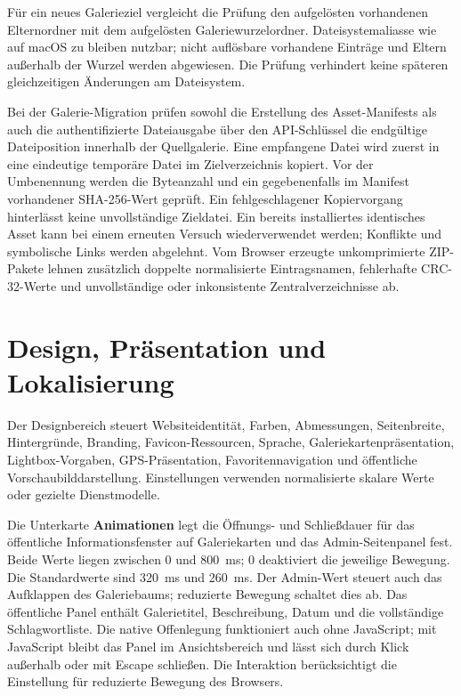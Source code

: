 \documentclass[11pt,a4paper]{article}
\newcommand{\filepath}[1]{\path{#1}}
\newcommand{\ui}[1]{\textbf{#1}}
\begin{document}
Für ein neues Galerieziel vergleicht die Prüfung den aufgelösten vorhandenen
Elternordner mit dem aufgelösten Galeriewurzelordner. Dateisystemaliasse wie
\filepath{/var} auf macOS zu \filepath{/private/var} bleiben nutzbar;
nicht auflösbare vorhandene Einträge und Eltern außerhalb der Wurzel werden
abgewiesen. Die Prüfung verhindert keine späteren gleichzeitigen Änderungen
am Dateisystem.

Bei der Galerie-Migration prüfen sowohl die Erstellung des Asset-Manifests als
auch die authentifizierte Dateiausgabe über den API-Schlüssel die endgültige
Dateiposition innerhalb der Quellgalerie. Eine empfangene Datei wird zuerst in
eine eindeutige temporäre Datei im Zielverzeichnis kopiert. Vor der Umbenennung
werden die Byteanzahl und ein gegebenenfalls im Manifest vorhandener
SHA-256-Wert geprüft. Ein fehlgeschlagener Kopiervorgang hinterlässt keine
unvollständige Zieldatei. Ein bereits installiertes identisches Asset kann bei
einem erneuten Versuch wiederverwendet werden; Konflikte und symbolische Links
werden abgelehnt. Vom Browser erzeugte unkomprimierte ZIP-Pakete lehnen
zusätzlich doppelte normalisierte Eintragsnamen, fehlerhafte CRC-32-Werte und
unvollständige oder inkonsistente Zentralverzeichnisse ab.

\section{Design, Präsentation und Lokalisierung}
\label{sec:theme}

Der Designbereich steuert Websiteidentität, Farben, Abmessungen, Seitenbreite,
Hintergründe, Branding, Favicon-Ressourcen, Sprache, Galeriekartenpräsentation,
Lightbox-Vorgaben, GPS-Präsentation, Favoritennavigation und öffentliche
Vorschaubilddarstellung. Einstellungen verwenden normalisierte skalare Werte
oder gezielte Dienstmodelle.

Die Unterkarte \ui{Animationen} legt die Öffnungs- und Schließdauer für das
öffentliche Informationsfenster auf Galeriekarten und das Admin-Seitenpanel
fest. Beide Werte liegen zwischen 0 und 800~ms; 0 deaktiviert die jeweilige
Bewegung. Die Standardwerte sind 320~ms und 260~ms. Der Admin-Wert steuert auch
das Aufklappen des Galeriebaums; reduzierte Bewegung schaltet dies ab.
Das öffentliche Panel
enthält Galerietitel, Beschreibung, Datum und die vollständige Schlagwortliste.
Die native Offenlegung funktioniert auch ohne JavaScript; mit JavaScript bleibt
das Panel im Ansichtsbereich und lässt sich durch Klick außerhalb oder mit
Escape schließen. Die Interaktion berücksichtigt die Einstellung für reduzierte
Bewegung des Browsers.
\end{document}
